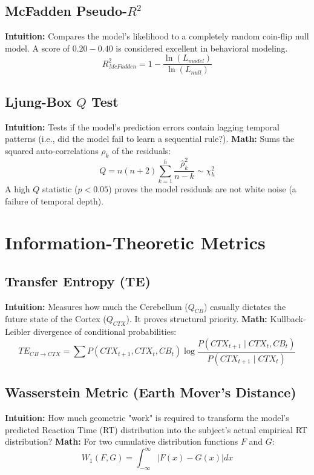 \documentclass[11pt,a4paper]{article}
\begin{document}
\subsection{McFadden Pseudo-$R^2$}
\textbf{Intuition:} Compares the model's likelihood to a completely random coin-flip null model. A score of $0.20 - 0.40$ is considered excellent in behavioral modeling.
\begin{equation}
    R_{McFadden}^2 = 1 - \frac{\ln(L_{model})}{\ln(L_{null})}
\end{equation}

\subsection{Ljung-Box $Q$ Test}
\textbf{Intuition:} Tests if the model's prediction errors contain lagging temporal patterns (i.e., did the model fail to learn a sequential rule?).
\textbf{Math:} Sums the squared auto-correlations $\rho_k$ of the residuals:
\begin{equation}
    Q = n(n+2) \sum_{k=1}^h \frac{\hat{\rho}_k^2}{n-k} \sim \chi^2_h
\end{equation}
A high $Q$ statistic ($p < 0.05$) proves the model residuals are not white noise (a failure of temporal depth).

\section{Information-Theoretic Metrics}

\subsection{Transfer Entropy (TE)}
\textbf{Intuition:} Measures how much the Cerebellum ($Q_{CB}$) casually dictates the future state of the Cortex ($Q_{CTX}$). It proves structural priority.
\textbf{Math:} Kullback-Leibler divergence of conditional probabilities:
\begin{equation}
    TE_{CB \to CTX} = \sum P(CTX_{t+1}, CTX_t, CB_t) \log \frac{P(CTX_{t+1} \mid CTX_t, CB_t)}{P(CTX_{t+1} \mid CTX_t)}
\end{equation}

\subsection{Wasserstein Metric (Earth Mover's Distance)}
\textbf{Intuition:} How much geometric "work" is required to transform the model's predicted Reaction Time (RT) distribution into the subject's actual empirical RT distribution?
\textbf{Math:} For two cumulative distribution functions $F$ and $G$:
\begin{equation}
    W_1(F, G) = \int_{-\infty}^{\infty} |F(x) - G(x)| dx
\end{equation}
\end{document}
